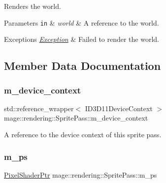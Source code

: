 Renders the world.


\begin{DoxyParams}[1]{Parameters}
\mbox{\tt in}  & {\em world} & A reference to the world. \\
\hline
\end{DoxyParams}

\begin{DoxyExceptions}{Exceptions}
{\em \mbox{\hyperlink{classmage_1_1_exception}{Exception}}} & Failed to render the world. \\
\hline
\end{DoxyExceptions}


\subsection{Member Data Documentation}
\mbox{\label{classmage_1_1rendering_1_1_sprite_pass_a9e8435cadd9b3484d9845690204c5706}} 
\subsubsection{\texorpdfstring{m\+\_\+device\+\_\+context}{m\_device\_context}}
{\footnotesize\ttfamily std\+::reference\+\_\+wrapper$<$ I\+D3\+D11\+Device\+Context $>$ mage\+::rendering\+::\+Sprite\+Pass\+::m\+\_\+device\+\_\+context\hspace{0.3cm}{\ttfamily [private]}}

A reference to the device context of this sprite pass. \mbox{\label{classmage_1_1rendering_1_1_sprite_pass_aac258f752dde77f0e428b8d8725b8e66}} 
\subsubsection{\texorpdfstring{m\+\_\+ps}{m\_ps}}
{\footnotesize\ttfamily \mbox{\hyperlink{namespacemage_1_1rendering_af03d922b228ee9c8542baaa2ecc9f259}{Pixel\+Shader\+Ptr}} mage\+::rendering\+::\+Sprite\+Pass\+::m\+\_\+ps\hspace{0.3cm}{\ttfamily [private]}}

